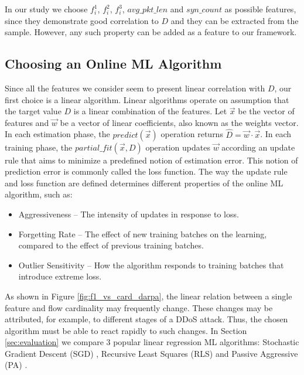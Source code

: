 		In our study we choose $f_i^1$, $f_i^2$, $f_i^3$, $avg\_pkt\_len$ and $syn\_count$ as possible features, since they demonstrate good correlation to $D$ and they can be extracted from the sample. However, any such property can be added as a feature to our framework.
		
	\subsection{Choosing an Online ML Algorithm} \label{subsec:ol_alg}

		Since all the features we consider seem to present linear correlation with $D$, our first choice is a linear algorithm. Linear algorithms operate on assumption that the target value $D$ is a linear combination of the features. Let $\vec{x}$ be the vector of features and $\vec{w}$ be a vector of linear coefficients, also known as the weights vector. In each estimation phase, the $predict(\vec{x})$ operation returns $\hat{D} = \vec{w} \cdot \vec{x}$. In each training phase, the $partial\_fit(\vec{x}, D)$ operation updates $\vec{w}$ according an update rule that aims to minimize a predefined notion of estimation error. This notion of prediction error is commonly called the loss function. The way the update rule and loss function are defined determines different properties of the online ML algorithm, such as:

		\begin{itemize}
			\item Aggressiveness -- The intensity of updates in response to loss. 
			\item Forgetting Rate -- The effect of new training batches on the learning, compared to the effect of previous training batches.
			\item Outlier Sensitivity -- How the algorithm responds to training batches that introduce extreme loss. 
		\end{itemize}
		
		As shown in Figure \ref{fig:f1_vs_card_darpa}, the linear relation between a single feature and flow cardinality may frequently change. These changes may be attributed, for example, to different stages of a DDoS attack. Thus, the chosen algorithm must be able to react rapidly to such changes. In Section \ref{sec:evaluation} we compare 3 popular linear regression ML algorithms: Stochastic Gradient Descent (SGD) \cite{kiefer1952stochastic}, Recursive Least Squares (RLS) \cite{grant1987recursive} and Passive Aggressive (PA) \cite{crammer2006online}. 
		
